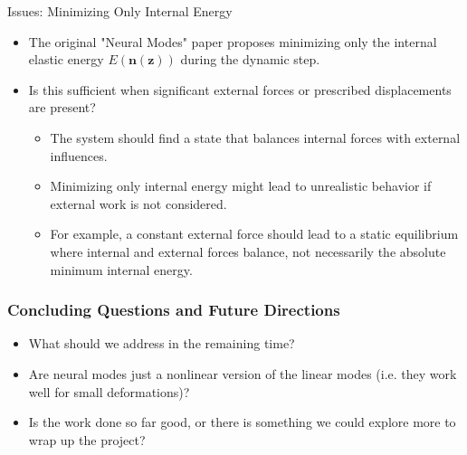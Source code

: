 \documentclass{beamer}
\begin{document}
\begin{frame}{Issues: Minimizing Only Internal Energy}
    \begin{itemize}
        \item The original "Neural Modes" paper proposes minimizing only the internal elastic energy \(E(\bm{n}(\bm{z}))\) during the dynamic step.
        \item Is this sufficient when significant external forces or prescribed displacements are present?
        \begin{itemize}
            \item The system should find a state that balances internal forces with external influences.
            \item Minimizing only internal energy might lead to unrealistic behavior if external work is not considered.
            \item For example, a constant external force should lead to a static equilibrium where internal and external forces balance, not necessarily the absolute minimum internal energy.
        \end{itemize}
    \end{itemize}
\end{frame}




\begin{frame}
    \frametitle{Concluding Questions and Future Directions}
    \begin{itemize}
        \item What should we address in the remaining time?
        \item Are neural modes just a nonlinear version of the linear modes (i.e. they work well for small deformations)?
        \item Is the work done so far good, or there is something we could explore more to wrap up the project?
    \end{itemize}
\end{frame}
\end{document}
